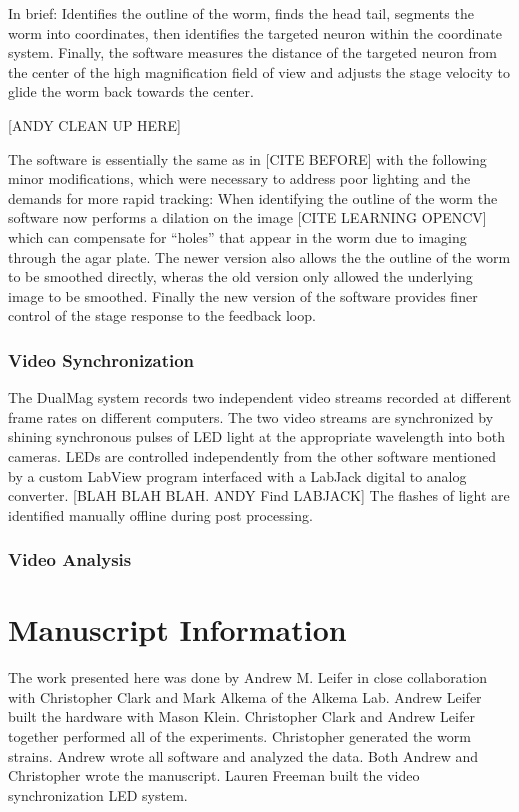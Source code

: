 In brief:
Identifies the outline of the worm, finds the head tail, segments the worm into coordinates, then identifies the targeted neuron within the coordinate system. Finally, the software measures the distance of the targeted neuron from the center of the high magnification field of view and adjusts the stage velocity to glide the worm back towards the center. 

[ANDY CLEAN UP HERE]


The software is essentially the same as in [CITE BEFORE] with the following minor modifications, which were necessary to address poor lighting and the demands for more rapid tracking: When identifying the outline of the worm the software now performs a dilation on the image [CITE LEARNING OPENCV] which can compensate for ``holes'' that appear in the worm due to imaging through the agar plate. The newer version also allows the the outline of the worm to be smoothed directly, wheras the old version only allowed the underlying image to be smoothed. Finally the new version of the software provides finer control of the stage response to the feedback loop. 




\subsubsection{Video Synchronization}
The DualMag system records two independent video streams recorded at different frame rates on different computers. The two video streams are synchronized by shining synchronous pulses of LED light at the appropriate wavelength into both cameras. LEDs are controlled independently from the other software mentioned by a custom LabView program  interfaced with a LabJack digital to analog converter. [BLAH BLAH BLAH. ANDY Find LABJACK] The flashes of light are identified manually offline during post processing. 

\subsubsection{Video Analysis}





\section{Manuscript Information}
The work presented here was done by Andrew M. Leifer in close collaboration with Christopher Clark and Mark Alkema of the Alkema Lab. Andrew Leifer built the hardware with Mason Klein. Christopher Clark and Andrew Leifer together performed all of the experiments. Christopher generated the worm strains. Andrew wrote all software and analyzed the data. Both Andrew and Christopher wrote the manuscript. Lauren Freeman built the video synchronization LED system. 






